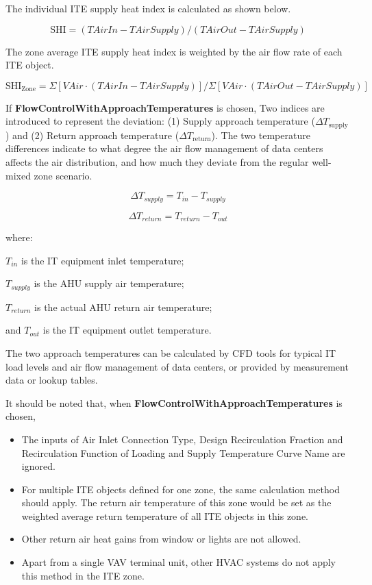 The individual ITE supply heat index is calculated as shown below.

\begin{equation}
\textrm{SHI} = (TAirIn - TAirSupply) / (TAirOut - TAirSupply)
\end{equation}

The zone average ITE supply heat index is weighted by the air flow rate of each ITE object.

\begin{equation}
\textrm{SHI}_{\textrm{Zone}} = \Sigma [VAir \cdot (TAirIn - TAirSupply)] / \Sigma [VAir \cdot (TAirOut - TAirSupply)]
\end{equation}

If \textbf{FlowControlWithApproachTemperatures} is chosen, Two indices are introduced to represent the deviation: (1) Supply approach temperature ($\Delta T_{\textrm{supply}}$) and (2) Return approach temperature ($\Delta T_{\textrm{return}}$). The two temperature differences indicate to what degree the air flow management of data centers affects the air distribution, and how much they deviate from the regular well-mixed zone scenario.

\begin{equation}
\Delta T_{supply}=T_{in}-T_{supply}
\end{equation}

\begin{equation}
\Delta T_{return}=T_{return}-T_{out}
\end{equation}

where:

$T_{in}$ is the IT equipment inlet temperature;

$T_{supply}$ is the AHU supply air temperature;

$T_{return}$ is the actual AHU return air temperature;

and $T_{out}$ is the IT equipment outlet temperature.

The two approach temperatures can be calculated by CFD tools for typical IT load levels and air flow management of data centers, or provided by measurement data or lookup tables. 

It should be noted that, when \textbf{FlowControlWithApproachTemperatures} is chosen, 

\begin{itemize}
\item The inputs of Air Inlet Connection Type, Design Recirculation Fraction and Recirculation Function of Loading and Supply Temperature Curve Name are ignored.
\item For multiple ITE objects defined for one zone, the same calculation method should apply. The return air temperature of this zone would be set as the weighted average return temperature of all ITE objects in this zone.
\item Other return air heat gains from window or lights are not allowed.
\item Apart from a single VAV terminal unit, other HVAC systems do not apply this method in the ITE zone.
\end{itemize}

